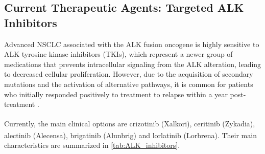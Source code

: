 \subsection{Current Therapeutic Agents: Targeted ALK Inhibitors}

Advanced NSCLC associated with the ALK fusion oncogene is highly sensitive to ALK tyrosine kinase inhibitors (TKIs), which represent a newer group of medications that prevents intracellular signaling from the ALK alteration, leading to decreased cellular proliferation. However, due to the acquisition of secondary mutations and the activation of alternative pathways, it is common for patients who initially responded positively to treatment to relapse within a year post-treatment \cite{NSCLC_therapies}. 

Currently, the main clinical options are crizotinib (Xalkori\textsuperscript\textregistered{}), ceritinib (Zykadia\textsuperscript\textregistered{}), alectinib (Alecensa\textsuperscript\textregistered{}), brigatinib (Alunbrig\textsuperscript\textregistered{}) and lorlatinib (Lorbrena\textsuperscript\textregistered{}). Their main characteristics are summarized in \autoref{tab:ALK_inhibitors}.

